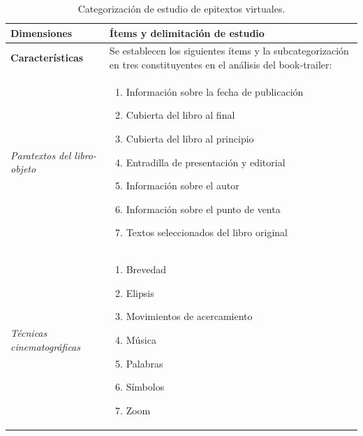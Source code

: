 \documentclass[spanish]{textolivre}
\begin{document}
\begin{table}[h!]
\centering
\begin{threeparttable}
\caption{Categorización de estudio de epitextos virtuales.}
\label{tbl02}
\begin{tabular}{p{}p{}}
\toprule 
\textbf{Dimensiones} &
\textbf{Ítems y delimitación de estudio} \\
\midrule
\textbf{Características} & 
Se establecen los siguientes ítems y la subcategorización en tres constituyentes en el análisis del book-trailer: \\

\emph{Paratextos del libro-objeto} &
\vspace{-0.6\baselineskip}
\begin{enumerate}[series=table,nosep,partopsep=0pt,topsep=0pt,parsep=0pt]
    \item \label{itm1} Información sobre la fecha de publicación
    \item \label{itm2} Cubierta del libro al final
    \item \label{itm3} Cubierta del libro al principio
    \item \label{itm4} Entradilla de presentación y editorial
    \item \label{itm5} Información sobre el autor
    \item \label{itm6} Información sobre el punto de venta
    \item \label{itm7} Textos seleccionados del libro original
\end{enumerate} \\

\emph{Técnicas cinematográficas} &
\vspace{-0.6\baselineskip}
\begin{enumerate}[resume*=table,nosep,partopsep=0pt,topsep=0pt,parsep=0pt]
    \item \label{itm8} Brevedad
    \item \label{itm9} Elipsis
    \item \label{itm10} Movimientos de acercamiento
    \item \label{itm11} Música
    \item \label{itm12} Palabras
    \item \label{itm13} Símbolos
    \item \label{itm14} Zoom
\end{enumerate}
\\


\end{tabular}
\end{threeparttable}
\end{table}
\end{document}
